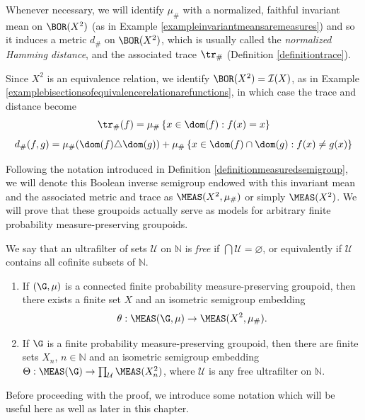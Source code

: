 Whenever necessary, we will identify $\mu_\#$ with a normalized, faithful invariant mean on $\BOR(X^2)$ (as in Example \ref{exampleinvariantmeansaremeasures}) and so it induces a metric $d_\#$ on $\BOR(X^2)$, which is usually called the \emph{normalized Hamming distance}, and the associated trace $\tr_\#$ (Definition \ref{definitiontrace}).

Since $X^2$ is an equivalence relation, we identify $\BOR(X^2)=\mathcal{I}(X)$, as in Example \ref{examplebisectionsofequivalencerelationarefunctions}, in which case the trace and distance become
\[\tr_\#(f)=\mu_\#\left\{x\in\dom(f):f(x)=x\right\}\]
\[d_\#(f,g)=\mu_\#(\dom(f)\triangle\dom(g))+\mu_\#\left\{x\in\dom(f)\cap\dom(g):f(x)\neq g(x)\right\}\]

Following the notation introduced in Definition \ref{definitionmeasuredsemigroup}, we will denote this Boolean inverse semigroup endowed with this invariant mean and the associated metric and trace as $\MEAS(X^2,\mu_\#)$ or simply $\MEAS(X^2)$. We will prove that these groupoids actually serve as models for arbitrary finite probability measure-preserving groupoids.

We say that an ultrafilter of sets $\mathcal{U}$ on $\mathbb{N}$ is \emph{free} if $\bigcap\mathcal{U}=\varnothing$, or equivalently if $\mathcal{U}$ contains all cofinite subsets of $\mathbb{N}$.

\begin{proposition}\label{propositionfinitegroupoidsaresofic}
\begin{enumerate}
\item[(a)] If $(\G,\mu)$ is a connected finite probability measure-preserving groupoid, then there exists a finite set $X$ and an isometric semigroup embedding
\[\theta:\MEAS(\G,\mu)\to\MEAS(X^2,\mu_\#).\]
\item[(b)] If $\G$ is a finite probability measure-preserving groupoid, then there are finite sets $X_n$, $n\in\mathbb{N}$ and an isometric semigroup embedding $\Theta:\MEAS(\G)\to\prod_\mathcal{U}\MEAS(X_n^2)$, where $\mathcal{U}$ is any free ultrafilter on $\mathbb{N}$.
\end{enumerate}
\end{proposition}

Before proceeding with the proof, we introduce some notation which will be useful here as well as later in this chapter.

